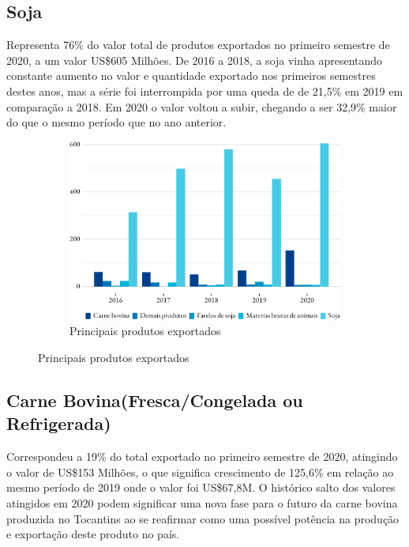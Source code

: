 \subsection{Soja}

\par Representa 76\% do valor total de produtos exportados no primeiro semestre de 2020, a um valor US\$605 Milhões. De 2016 a 2018, a soja vinha apresentando constante aumento no valor e quantidade exportado nos primeiros semestres destes anos, mas a série foi interrompida por uma queda de de 21,5\% em 2019 em comparação a 2018. Em 2020 o valor voltou a subir, chegando a ser 32,9\% maior do que o mesmo período que no ano anterior.

\begin{figure}[!h]
	\begin{subfigure}{\linewidth}
		\caption{Principais produtos exportados}
		\includegraphics{fig/produtos_expo-1.pdf}
	\end{subfigure}
\end{figure}

\subsection{Carne Bovina(Fresca/Congelada ou Refrigerada)}
Correspondeu a 19\% do total exportado no primeiro semestre de 2020, atingindo o valor de US\$153 Milhões, o que significa crescimento de 125,6\% em relação ao mesmo período de 2019 onde o valor foi US\$67,8M. O histórico salto dos valores atingidos em 2020 podem significar uma nova fase para o futuro da carne bovina produzida no Tocantins ao se reafirmar como uma possível potência na produção e exportação deste produto no país.

